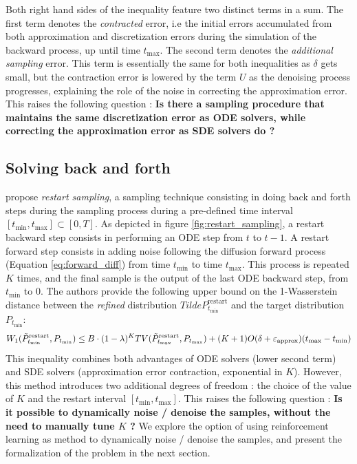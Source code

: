 Both right hand sides of the inequality feature two distinct terms in a sum. The first term denotes the \textit{contracted} error, i.e the initial errors
accumulated from both approximation and discretization errors during the simulation of the backward
process, up until time $t_{\max}$. The second term denotes the \textit{additional sampling} error. This term is essentially the same for both inequalities as $\delta$ gets small, but the contraction error is lowered by the term $U$ as the denoising process progresses, explaining the role of the noise in correcting the approximation error. 
This raises the following question : 
\textbf{Is there a sampling procedure that maintains the same discretization error as ODE solvers, while correcting the approximation error as SDE solvers do ?}

\subsection{Solving back and forth}
\citep{xu_2023_restart} propose \textit{restart sampling}, a sampling technique consisting in doing back and forth steps during the sampling process during a pre-defined time interval $[t_{\min},t_{\max}] \subset [0,T]$. As depicted in figure \ref{fig:restart_sampling}, a restart backward step consists in performing an ODE step from $t$ to $t-1$. A restart forward step consists in adding noise following the diffusion forward process (Equation \ref{eq:forward_diff}) from time $t_{\min}$ to time $t_{\max}$. This process is repeated $K$ times, and the final sample is the output of the last ODE backward step, from $t_{\min}$ to 0.
The authors provide the following upper bound on the 1-Wasserstein distance between the \textit{refined} distribution $Tilde{P}_{t_{\min}}^{\mathrm{restart}}$ and the target distribution $P_{t_{\min}}$:
\begin{equation}
    W_{1}(\Tilde{P}_{t_{\min}}^{\mathrm{restart}},P_{t_{\min}}) \leq B \cdot (1 - \lambda)^{K}TV(\Tilde{P}_{t_{\max}}^{\mathrm{restart}},P_{t_{\max}}) + (K+1) O(\delta + \varepsilon_{\mathrm{approx}})(t_{\max}-t_{\min})
\end{equation}
This inequality combines both advantages of ODE solvers (lower second term) and SDE solvers (approximation error contraction, exponential in $K$). 
However, this method introduces two additional degrees of freedom : the choice of the value of $K$ and the restart interval $[t_{\min},t_{\max}]$. This raises the following question : 
\textbf{Is it possible to dynamically noise / denoise the samples, without the need to manually tune $K$ ?}
We explore the option of using reinforcement learning as method to dynamically noise / denoise the samples, and present the formalization of the problem in the next section.
